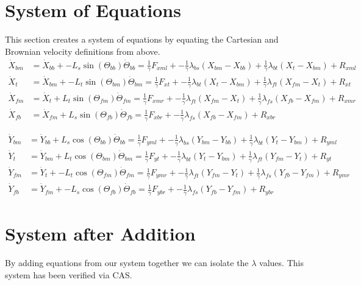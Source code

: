 \documentclass[11pt, landscape]{article}
\begin{document}
\section{System of Equations}
This section creates a system of equations by equating the Cartesian and Brownian velocity definitions from above. \\

\begin{align}  
  \dot{X}_{bm} &= \dot{X}_{bb} + - L_{s}\sin(\Theta_{bb})\dot{\Theta}_{bb} = \frac{1}{\gamma}F_{xml} + -\frac{1}{\gamma}\lambda_{bs}(X_{bm} - X_{bb}) + \frac{1}{\gamma}\lambda_{bt}(X_{t } - X_{bm}) + R_{xml} \\
  \dot{X}_{t}  &= \dot{X}_{bm} + - L_{t}\sin(\Theta_{bm})\dot{\Theta}_{bm} = \frac{1}{\gamma}F_{xt } + -\frac{1}{\gamma}\lambda_{bt}(X_{t } - X_{bm}) + \frac{1}{\gamma}\lambda_{ft}(X_{fm} - X_{t }) + R_{xt } \\
  \dot{X}_{fm} &= \dot{X}_{t } + L_{t}\sin(\Theta_{fm})\dot{\Theta}_{fm} = \frac{1}{\gamma}F_{xmr} + -\frac{1}{\gamma}\lambda_{ft}(X_{fm} - X_{t }) + \frac{1}{\gamma}\lambda_{fs}(X_{fb} - X_{fm}) + R_{xmr} \\
  \dot{X}_{fb} &= \dot{X}_{fm} + L_{s}\sin(\Theta_{fb})\dot{\Theta}_{fb} = \frac{1}{\gamma}F_{xbr} + -\frac{1}{\gamma}\lambda_{fs}(X_{fb} - X_{fm}) + R_{xbr}
\end{align}

\begin{align}  
  \dot{Y}_{bm} &= \dot{Y}_{bb} + L_{s}\cos(\Theta_{bb})\dot{\Theta}_{bb} = \frac{1}{\gamma}F_{yml} + -\frac{1}{\gamma}\lambda_{bs}(Y_{bm} - Y_{bb}) + \frac{1}{\gamma}\lambda_{bt}(Y_{t } - Y_{bm}) + R_{yml} \\
  \dot{Y}_{t}  &= \dot{Y}_{bm} + L_{t}\cos(\Theta_{bm})\dot{\Theta}_{bm} = \frac{1}{\gamma}F_{yt } + -\frac{1}{\gamma}\lambda_{bt}(Y_{t } - Y_{bm}) + \frac{1}{\gamma}\lambda_{ft}(Y_{fm} - Y_{t }) + R_{yt } \\
  \dot{Y}_{fm} &= \dot{Y}_{t } + - L_{t}\cos(\Theta_{fm})\dot{\Theta}_{fm} = \frac{1}{\gamma}F_{ymr} + -\frac{1}{\gamma}\lambda_{ft}(Y_{fm} - Y_{t }) + \frac{1}{\gamma}\lambda_{fs}(Y_{fb} - Y_{fm}) + R_{ymr} \\
  \dot{Y}_{fb} &= \dot{Y}_{fm} + - L_{s}\cos(\Theta_{fb})\dot{\Theta}_{fb} = \frac{1}{\gamma}F_{ybr} + -\frac{1}{\gamma}\lambda_{fs}(Y_{fb} - Y_{fm}) + R_{ybr}
\end{align}

\section{System after Addition}
By adding equations from our system together we can isolate the $\lambda$ values. This system has been verified via CAS.\\
\end{document}
